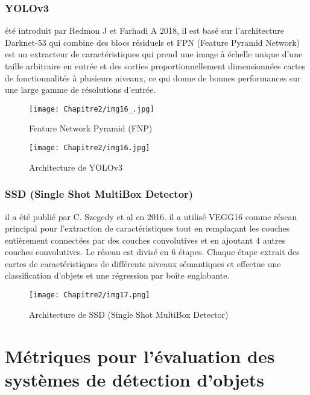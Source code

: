      \subsubsection{YOLOv3} \cite{yolov3_paper}
     été introduit par Redmon J et Farhadi A 2018, il est basé sur l'architecture Darknet-53 qui combine des blocs résiduels et FPN (Feature Pyramid Network) est un extracteur de caractéristiques qui prend une image à échelle unique d'une taille arbitraire en entrée et des sorties proportionnellement dimensionnées cartes de fonctionnalités à plusieurs niveaux, ce qui donne de bonnes performances sur une large gamme de résolutions d'entrée.
     \begin{figure}[H]
          \centering
          \texttt{[image: Chapitre2/img16\_.jpg]}
          \caption{Feature Network Pyramid (FNP)}
          \label{img16_}
          \end{figure}
     \begin{figure}[H]
          \centering
          \texttt{[image: Chapitre2/img16.jpg]}
          \caption{Architecture de YOLOv3}
          \label{img16}
          \end{figure}
     
          
     \subsubsection{SSD (Single Shot MultiBox Detector)} \cite{ssd_paper}
     il a été publié par C. Szegedy et al en 2016. il a utilisé VEGG16 comme réseau principal pour l'extraction de caractéristiques tout en remplaçant les couches entièrement connectées par des couches convolutives et en ajoutant 4 autres couches convolutives. Le réseau est divisé en 6 étapes. Chaque étape extrait des cartes de caractéristiques de différents niveaux sémantiques et effectue une classification d'objets et une régression par boîte englobante.
     \begin{figure}[H]
          \centering
          \texttt{[image: Chapitre2/img17.png]}
          \caption{Architecture de SSD (Single Shot MultiBox Detector)}
          \label{img17}
          \end{figure}

\section{Métriques pour l'évaluation des systèmes de détection d'objets} 

